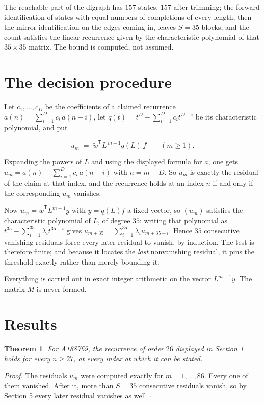 \documentclass[11pt]{article}
\newtheorem{theorem}{Theorem}
\theoremstyle{definition}
\begin{document}
The reachable part of the digraph has $157$ states, $157$ after trimming; the forward identification of states with equal numbers of completions of every length, then the mirror identification on the edges coming in, leaves $S = 35$ blocks, and the count satisfies the linear recurrence given by the characteristic polynomial of that $35\times35$ matrix. The bound is computed, not assumed.

\section{The decision procedure}

Let $c_1,\dots,c_D$ be the coefficients of a claimed recurrence $a(n) = \sum_{i=1}^{D} c_i\,a(n-i)$, let $q(t) = t^{D} - \sum_{i=1}^{D} c_i t^{D-i}$ be its characteristic polynomial, and put

\[u_m \;=\; \tilde w^{\mathsf T} L^{\,m-1} q(L)\,\tilde f \qquad (m \ge 1).\]

Expanding the powers of $L$ and using the displayed formula for $a$, one gets $u_m = a(n) - \sum_{i=1}^{D} c_i\,a(n-i)$ with $n = m + D$. So $u_m$ is exactly the residual of the claim at that index, and the recurrence holds at an index $n$ if and only if the corresponding $u_m$ vanishes.

Now $u_m = \tilde w^{\mathsf T} L^{m-1} y$ with $y = q(L)\tilde f$ a fixed vector, so $(u_m)$ satisfies the characteristic polynomial of $L$, of degree $35$: writing that polynomial as $t^{35} - \sum_{i=1}^{35} \lambda_i t^{35-i}$ gives $u_{m+35} = \sum_{i=1}^{35} \lambda_i u_{m+35-i}$. Hence $35$ consecutive vanishing residuals force every later residual to vanish, by induction. The test is therefore finite; and because it locates the {\itshape last} nonvanishing residual, it pins the threshold exactly rather than merely bounding it.

Everything is carried out in exact integer arithmetic on the vector $L^{m-1}y$. The matrix $M$ is never formed.

\section{Results}

\begin{theorem} For A188769, the recurrence of order $26$ displayed in Section 1 holds for every $n \ge 27$, at every index at which it can be stated.\end{theorem}

{\itshape Proof.} The residuals $u_m$ were computed exactly for $m = 1,\dots,86$. Every one of them vanished. After it, more than $S = 35$ consecutive residuals vanish, so by Section 5 every later residual vanishes as well. $\square$
\end{document}
